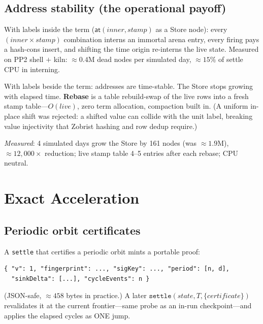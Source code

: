 \documentclass[11pt]{article}
\theoremstyle{remark}
\begin{document}
\subsection{Address stability (the operational payoff)}
\label{sec:address-stability}

With labels inside the term ($\mathsf{at}(\mathit{inner}, \mathit{stamp})$ as a
Store node): every $(\mathit{inner} \times \mathit{stamp})$ combination interns an
immortal arena entry, every firing pays a hash-cons insert, and shifting the time
origin re-interns the live state.  Measured on PP2 shell $+$ kiln: $\approx
0.4$M dead nodes per simulated day, $\approx 15\%$ of settle CPU in interning.

With labels beside the term: addresses are time-stable.  The Store stops growing
with elapsed time.  \textbf{Rebase} is a table rebuild-swap of the live rows into
a fresh stamp table---$O(\mathit{live})$, zero term allocation, compaction built
in.  (A uniform in-place shift was rejected: a shifted value can collide with the
unit label, breaking value injectivity that Zobrist hashing and row dedup
require.)

\textit{Measured}: 4 simulated days grow the Store by 161 nodes (was $\approx
1.9$M), $\approx 12{,}000\times$ reduction; live stamp table 4--5 entries after
each rebase; CPU neutral.

\section{Exact Acceleration}
\label{sec:acceleration}

\subsection{Periodic orbit certificates}
\label{sec:orbit-certs}

A \texttt{settle} that certifies a periodic orbit mints a portable proof:

\begin{lstlisting}[language={}]
{ "v": 1, "fingerprint": ..., "sigKey": ..., "period": [n, d],
  "sinkDelta": [...], "cycleEvents": n }
\end{lstlisting}

(JSON-safe, $\approx 458$ bytes in practice.)  A later
$\mathtt{settle}(\mathit{state}, T, \{\mathit{certificate}\})$ revalidates it at
the current frontier---same probe as an in-run checkpoint---and applies the
elapsed cycles as ONE jump.
\end{document}
